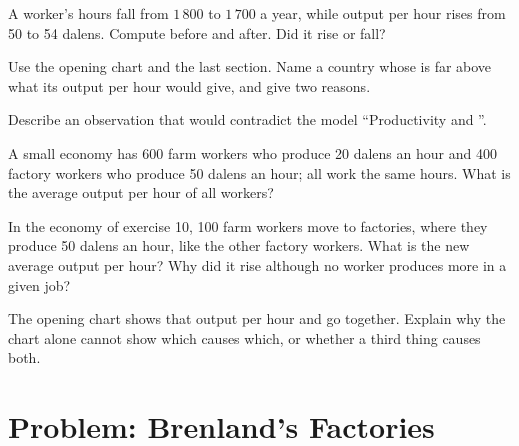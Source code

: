 \begin{exercise}[$\star\star$]\label{exo:g8:production-and-productivity:7}
A worker's hours fall from $1\,800$ to $1\,700$ a year, while output per hour rises from 50 to 54
dalens. Compute  before and after. Did it rise or fall?
\end{exercise}

\begin{exercise}[$\star\star$]\label{exo:g8:production-and-productivity:8}
Use the opening chart and the last section. Name a country whose  is far above
what its output per hour would give, and give two reasons.
\end{exercise}

\begin{exercise}[$\star\star$]\label{exo:g8:production-and-productivity:9}
Describe an observation that would contradict the model ``Productivity and ''.
\end{exercise}

\begin{exercise}[$\star\star\star$]\label{exo:g8:production-and-productivity:10}
A small economy has 600 farm workers who produce 20 dalens an hour and 400 factory workers who
produce 50 dalens an hour; all work the same hours. What is the average output per hour of all
workers?
\end{exercise}

\begin{exercise}[$\star\star\star$]\label{exo:g8:production-and-productivity:11}
In the economy of exercise 10, 100 farm workers move to factories, where they produce 50 dalens
an hour, like the other factory workers. What is the new average output per hour? Why did it rise
although no worker produces more in a given job?
\end{exercise}

\begin{exercise}[$\star\star\star$]\label{exo:g8:production-and-productivity:12}
The opening chart shows that output per hour and  go together. Explain why the
chart alone cannot show which causes which, or whether a third thing causes both.
\end{exercise}

\section{Problem: Brenland's Factories}


